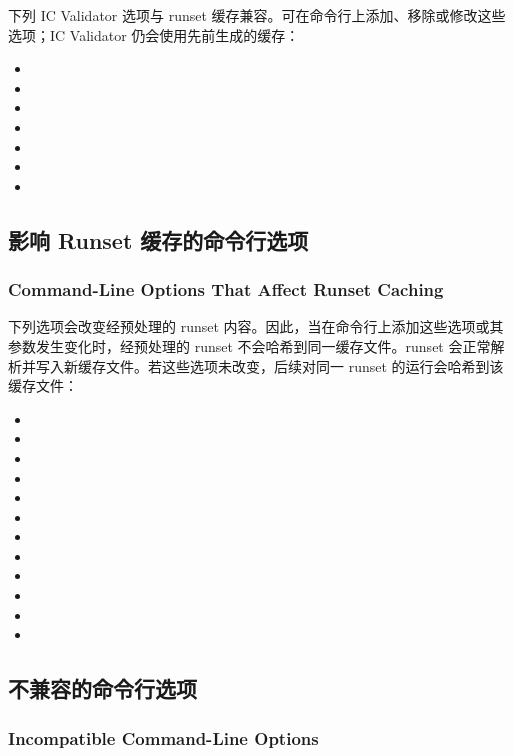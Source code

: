 下列 IC Validator 选项与 runset 缓存兼容。可在命令行上添加、移除或修改这些选项；IC Validator 仍会使用先前生成的缓存：
\begin{itemize}
  \item {}
  \item {}
  \item {}
  \item {}
  \item {}
  \item {}
  \item {}
\end{itemize}

\subsection{影响 Runset 缓存的命令行选项}
\subsubsection*{Command-Line Options That Affect Runset Caching}

下列选项会改变经预处理的 runset 内容。因此，当在命令行上添加这些选项或其参数发生变化时，经预处理的 runset 不会哈希到同一缓存文件。runset 会正常解析并写入新缓存文件。若这些选项未改变，后续对同一 runset 的运行会哈希到该缓存文件：
\begin{itemize}
  \item {}
  \item {}
  \item {}
  \item {}
  \item {}
  \item {}
  \item {}
  \item {}
  \item {}
  \item {}
  \item {}
  \item {}
\end{itemize}

\subsection{不兼容的命令行选项}
\subsubsection*{Incompatible Command-Line Options}


